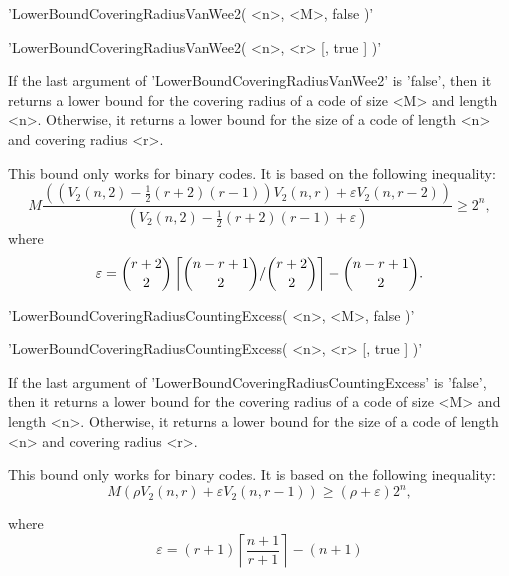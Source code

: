 
'LowerBoundCoveringRadiusVanWee2( <n>, <M>, false )'

'LowerBoundCoveringRadiusVanWee2( <n>, <r> [, true ] )'

If the last argument of 'LowerBoundCoveringRadiusVanWee2' is
'false', then it returns a lower bound for the covering radius of a
code of size <M> and length <n>.
Otherwise, it returns a lower bound for the size of a code of length
<n> and covering radius <r>.

This bound only works for binary codes.
It is based on the following inequality:
\begin{equation}
    M \frac{\left( \left( V_2(n,2) - \frac{1}{2}(r+2)(r-1) \right)
    V_2(n,r) + \varepsilon
    V_2(n,r-2) \right)}
    {(V_2(n,2) - \frac{1}{2}(r+2)(r-1) + \varepsilon)}
    \geq 2^n,
\end{equation}
where
\begin{equation}
    \varepsilon = {{r+2} \choose {2}} \left\lceil
    {{n-r+1} \choose {2}} / {{r+2} \choose {2}} \right\rceil
    - {{n-r+1} \choose {2}}.
\end{equation}




'LowerBoundCoveringRadiusCountingExcess( <n>, <M>, false )'

'LowerBoundCoveringRadiusCountingExcess( <n>, <r> [, true ] )'

If the last argument of 'LowerBoundCoveringRadiusCountingExcess' is
'false', then it returns a lower bound for the covering radius of a
code of size <M> and length <n>.
Otherwise, it returns a lower bound for the size of a code of length
<n> and covering radius <r>.

This bound only works for binary codes.
It is based on the following inequality:
\begin{equation}
    M \left( \rho V_2(n,r) + \varepsilon V_2(n,r-1) \right) \geq
    (\rho + \varepsilon) 2^n,
\end{equation}

where
\begin{equation}
    \varepsilon = (r+1) \left\lceil\frac{n+1}{r+1}\right\rceil - (n+1)
\end{equation}


